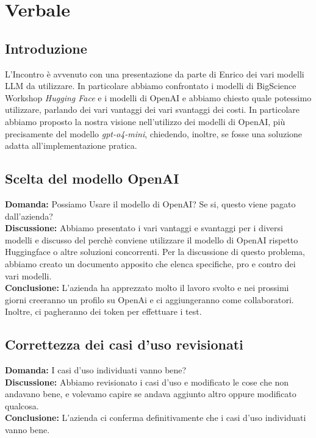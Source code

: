 \documentclass{article}
\begin{document}
\section{Verbale}
    \subsection{Introduzione}
    L'Incontro è avvenuto con una presentazione da parte di Enrico dei vari modelli LLM da utilizzare.
    In particolare abbiamo confrontato i modelli di BigScience Workshop \textit{Hugging Face} e i modelli di OpenAI e abbiamo chiesto
    quale potessimo utilizzare, parlando dei vari vantaggi dei vari svantaggi dei costi. In particolare abbiamo proposto la nostra visione 
    nell'utilizzo dei modelli di OpenAI, più precisamente del modello \textit{gpt-o4-mini}, chiedendo, inoltre, se fosse una soluzione adatta all'implementazione pratica.

    \subsection{Scelta del modello OpenAI}
    \textbf{Domanda:} Possiamo Usare il modello di OpenAI? Se si, questo viene pagato dall'azienda? \\
    \textbf{Discussione:} Abbiamo presentato i vari vantaggi e svantaggi per i diversi modelli e discusso del perchè conviene utilizzare il modello di OpenAI rispetto Huggingface o altre soluzioni concorrenti. Per la discussione di questo problema, abbiamo creato un documento apposito che elenca specifiche, pro e contro dei vari modelli. \\
    \textbf{Conclusione:} L'azienda ha apprezzato molto il lavoro svolto e nei prossimi giorni creeranno un profilo su OpenAi e ci aggiungeranno come collaboratori. Inoltre, ci pagheranno dei token per effettuare i test.

    \subsection{Correttezza dei casi d'uso revisionati}
    \textbf{Domanda:} I casi d'uso individuati vanno bene? \\
    \textbf{Discussione:} Abbiamo revisionato i casi d'uso e modificato le cose che non andavano bene, e volevamo capire se andava aggiunto altro oppure modificato qualcosa. \\
    \textbf{Conclusione:} L'azienda ci conferma definitivamente che i casi d'uso individuati vanno bene.
\end{document}
